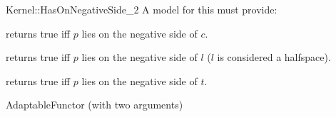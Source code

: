 \begin{ccRefFunctionObjectConcept}{Kernel::HasOnNegativeSide_2}
A model for this must provide:


{returns true iff $p$ lies on the negative side of $c$.}

{returns true iff $p$ lies on the negative side of $l$ 
($l$ is considered a halfspace).}

{returns true iff $p$ lies on the negative side of $t$.}

\ccRefines
AdaptableFunctor (with two arguments)

\ccSeeAlso
{} \\
\\
\\


\end{ccRefFunctionObjectConcept}
